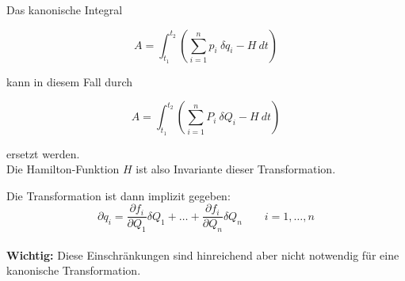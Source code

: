 \begin{frame}
    Das kanonische Integral 
    
    \begin{displaymath}
    A = \int_{t_1}^{t_2} \left( \sum_{i=1}^n p_i ~ \delta q_i - H ~ dt \right) 
    \end{displaymath}
    
    kann in diesem Fall durch
    
    \begin{displaymath}
    A = \int_{t_1}^{t_2} \left( \sum_{i=1}^n P_i ~ \delta Q_i - H ~ dt \right) 
    \end{displaymath}
    
    ersetzt werden. \\
    \vspace{5mm}
    Die Hamilton-Funktion $H$ ist also Invariante dieser Transformation.
    
\end{frame}


\begin{frame}
   Die Transformation ist dann implizit gegeben:\\

    \begin{displaymath}
        \partial q_i = \frac{\partial f_i}{\partial Q_1} \delta Q_1 + \ldots +  \frac{\partial f_i}{\partial Q_n} \delta Q_n \qquad i=1,\ldots,n
    \end{displaymath} \\
   \vspace{5mm}      
    \textbf{Wichtig:} Diese Einschränkungen sind hinreichend aber nicht notwendig für eine kanonische Transformation.
\end{frame}